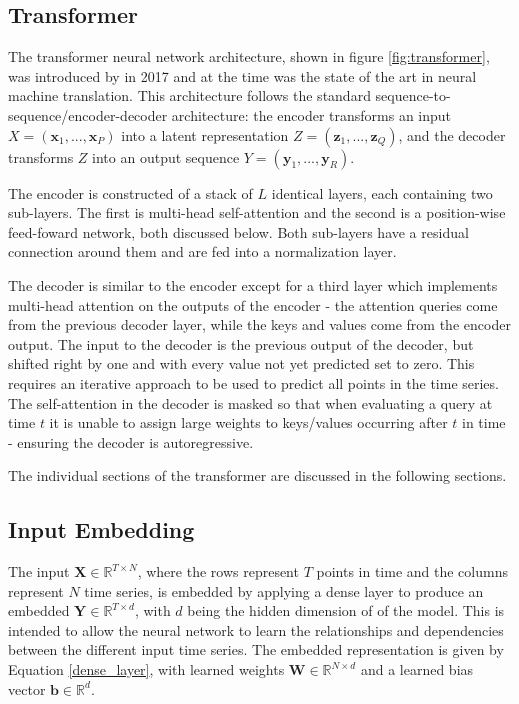 \documentclass[conference]{IEEEtran}
\begin{document}
\subsection{Transformer}
The transformer neural network architecture, shown in figure \ref{fig:transformer}, was introduced by \cite{Vaswani2017} in 2017 and at the time was the state of the art in neural machine translation.
This architecture follows the standard sequence-to-sequence/encoder-decoder architecture: the encoder transforms an input $X = (\boldsymbol{x}_1, ..., \boldsymbol{x}_P)$ into a latent representation $Z = (\boldsymbol{z}_1, ..., \boldsymbol{z}_Q)$, and the decoder transforms $Z$ into an output sequence $Y = (\boldsymbol{y}_1, ..., \boldsymbol{y}_R)$.

The encoder is constructed of a stack of $L$ identical layers, each containing two sub-layers.
The first is multi-head self-attention and the second is a position-wise feed-foward network, both discussed below.
Both sub-layers have a residual connection around them and are fed into a normalization layer.

The decoder is similar to the encoder except for a third layer which implements multi-head attention on the outputs of the encoder - the attention queries come from the previous decoder layer, while the keys and values come from the encoder output.
The input to the decoder is the previous output of the decoder, but shifted right by one and with every value not yet predicted set to zero.
This requires an iterative approach to be used to predict all points in the time series.
The self-attention in the decoder is masked so that when evaluating a query at time $t$ it is unable to assign large weights to keys/values occurring after $t$ in time - ensuring the decoder is autoregressive.

The individual sections of the transformer are discussed in the following sections.

\subsection{Input Embedding}
The input $\boldsymbol{X} \in \mathbb{R}^{T \times N}$, where the rows represent $T$ points in time and the columns represent $N$ time series, is embedded by applying a dense layer to produce an embedded $\boldsymbol{Y} \in \mathbb{R}^{T \times d}$, with $d$ being the hidden dimension of of the model.
This is intended to allow the neural network to learn the relationships and dependencies between the different input time series.
The embedded representation is given by Equation \ref{dense_layer}, with learned weights $\boldsymbol{W} \in \mathbb{R}^{N \times d}$ and a learned bias vector $\boldsymbol{b} \in \mathbb{R}^{d}$.
\end{document}
